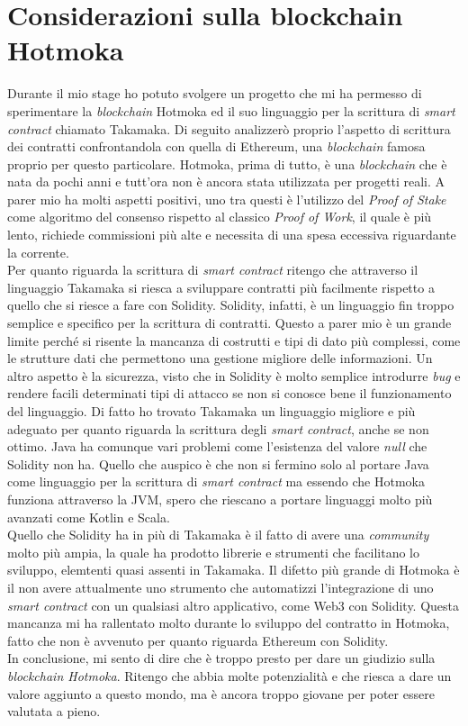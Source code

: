 
\section{Considerazioni sulla blockchain Hotmoka}
Durante il mio stage ho potuto svolgere un progetto che mi ha permesso di sperimentare la \textit{blockchain} Hotmoka ed il suo linguaggio per la scrittura di \textit{smart contract} chiamato Takamaka. Di seguito analizzerò proprio l'aspetto di scrittura dei contratti confrontandola con quella di Ethereum, una \textit{blockchain} famosa proprio per questo particolare. 
Hotmoka, prima di tutto, è una \textit{blockchain} che è nata da pochi anni e tutt'ora non è ancora stata utilizzata per progetti reali. A parer mio ha molti aspetti positivi, uno tra questi è l'utilizzo del \textit{Proof of Stake} come algoritmo del consenso rispetto al classico \textit{Proof of Work}, il quale è più lento, richiede commissioni più alte e necessita di una spesa eccessiva riguardante la corrente. \\

Per quanto riguarda la scrittura di \textit{smart contract} ritengo che attraverso il linguaggio Takamaka si riesca a sviluppare contratti più facilmente rispetto a quello che si riesce a fare con Solidity. Solidity, infatti, è un linguaggio fin troppo semplice e specifico per la scrittura di contratti. Questo a parer mio è un grande limite perché si risente la mancanza di costrutti e tipi di dato più complessi, come le strutture dati che permettono una gestione migliore delle informazioni. Un altro aspetto è la sicurezza, visto che in Solidity è molto semplice introdurre \textit{bug} e rendere facili determinati tipi di attacco se non si conosce bene il funzionamento del linguaggio.
Di fatto ho trovato Takamaka un linguaggio migliore e più adeguato per quanto riguarda la scrittura degli \textit{smart contract}, anche se non ottimo. Java ha comunque vari problemi come l'esistenza del valore \textit{null} che Solidity non ha. Quello che auspico è che non si fermino solo al portare Java come linguaggio per la scrittura di \textit{smart contract} ma essendo che Hotmoka funziona attraverso la JVM, spero che riescano a portare linguaggi molto più avanzati come Kotlin e Scala. \\

Quello che Solidity ha in più di Takamaka è il fatto di avere una \textit{community} molto più ampia, la quale ha prodotto librerie e strumenti che facilitano lo sviluppo, elemtenti quasi assenti in Takamaka. Il difetto più grande di Hotmoka è il non avere attualmente uno strumento che automatizzi l'integrazione di uno \textit{smart contract} con un qualsiasi altro applicativo, come Web3 con Solidity. Questa mancanza mi ha rallentato molto durante lo sviluppo del contratto in Hotmoka, fatto che non è avvenuto per quanto riguarda Ethereum con Solidity. \\

In conclusione, mi sento di dire che è troppo presto per dare un giudizio sulla \textit{blockchain Hotmoka}. Ritengo che abbia molte potenzialità e che riesca a dare un valore aggiunto a questo mondo, ma è ancora troppo giovane per poter essere valutata a pieno. 
